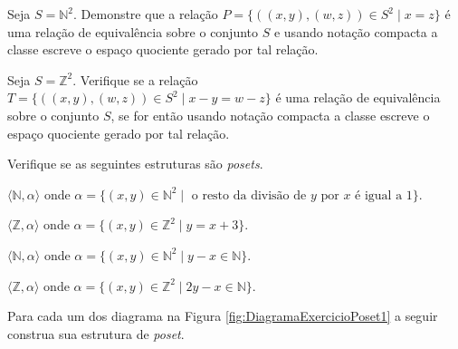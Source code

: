 \begin{problem}\label{prob:EquivalenciaOrdem12}
	Seja $S = \mathbb{N}^2$. Demonstre que a relação $P = \{((x, y), (w, z)) \in S^2 \mid x = z \}$ é uma relação de equivalência sobre o conjunto $S$ e usando notação compacta a classe escreve o espaço quociente gerado por tal relação.
\end{problem}

\begin{problem}\label{prob:EquivalenciaOrdem13}
	Seja $S = \mathbb{Z}^2$. Verifique se a relação $T = \{((x, y), (w, z)) \in S^2 \mid x - y = w - z \}$ é uma relação de equivalência sobre o conjunto $S$, se for então usando notação compacta a classe escreve o espaço quociente gerado por tal relação.
\end{problem}

\begin{problem}\label{prob:EquivalenciaOrdem14}
	Verifique se as seguintes estruturas são \textit{posets}.
\end{problem}

\begin{exerList}
	\item $\langle \mathbb{N}, \alpha \rangle$ onde $\alpha = \{(x, y) \in \mathbb{N}^2 \mid \text{ o resto da divisão de $y$ por $x$ é igual a } 1\}$.
	\item $\langle \mathbb{Z}, \alpha \rangle$ onde $\alpha = \{(x, y) \in \mathbb{Z}^2  \mid y = x + 3\}$.
	\item $\langle \mathbb{N}, \alpha \rangle$ onde $\alpha = \{(x, y) \in \mathbb{N}^2  \mid y - x \in \mathbb{N}\}$.
	\item $\langle \mathbb{Z}, \alpha \rangle$ onde $\alpha = \{(x, y) \in \mathbb{Z}^2  \mid 2y - x \in \mathbb{N}\}$.
\end{exerList}

\begin{problem}\label{prob:EquivalenciaOrdem15}
	Para cada um dos diagrama na Figura \ref{fig:DiagramaExercicioPoset1} a seguir construa sua estrutura de \textit{poset}.
\end{problem}

